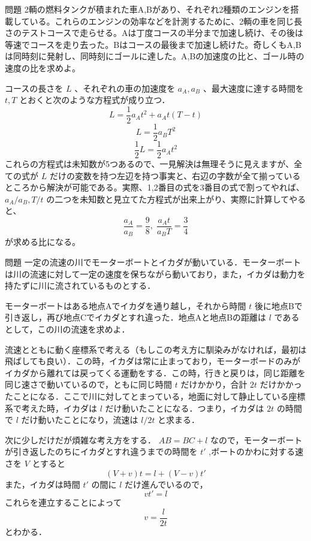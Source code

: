 \documentclass[
  b4paperpaper,
  xelatex,ja=standard]{bxjsbook}
\begin{document}
\begin{Qbox}{問題}
2輌の燃料タンクが積まれた車A,Bがあり、それぞれ2種類のエンジンを搭載している。これらのエンジンの効率などを計測するために、2輌の車を同じ長さのテストコースで走らせる。Aは丁度コースの半分まで加速し続け、その後は等速でコースを走り去った。Bはコースの最後まで加速し続けた。奇しくもA,Bは同時刻に発射し、同時刻にゴールに達した。A,Bの加速度の比と、ゴール時の速度の比を求めよ。

\end{Qbox}


コースの長さを \(L\) 、それぞれの車の加速度を \(a_A,a_B\)
、最大速度に達する時間を \(t,T\) とおくと次のような方程式が成り立つ．
\[L=\frac{1}{2}a_At^2+a_At(T-t)\] \[L=\frac{1}{2}a_BT^2\]
\[\frac{1}{2}L=\frac{1}{2}a_At^2\]
これらの方程式は未知数が5つあるので、一見解決は無理そうに見えますが、全ての式が
\(L\)
だけの変数を持つ左辺を持つ事実と、右辺の字数が全て揃っているところから解決が可能である。実際、1,2番目の式を3番目の式で割ってやれば、
\(a_A/a_B,T/t\)
の二つを未知数と見立てた方程式が出来上がり、実際に計算してやると、
\[\frac{a_A}{a_B}=\frac{9}{8},\;\frac{a_At}{a_BT}=\frac{3}{4}\]
が求める比になる。

\begin{Qbox}{問題}
一定の流速の川でモーターボートとイカダが動いている．モーターボートは川の流速に対して一定の速度を保ちながら動いており，また，イカダは動力を持たずに川に流されているものとする．

モーターボートはある地点Aでイカダを通り越し，それから時間 \(t\)
後に地点Bで引き返し，再び地点Cでイカダとすれ違った．地点Aと地点Bの距離は
\(l\) であるとして，この川の流速を求めよ．

\end{Qbox}


流速とともに動く座標系で考える（もしこの考え方に馴染みがなければ，最初は飛ばしても良い）．この時，イカダは常に止まっており，モーターボードのみがイカダから離れては戻ってくる運動をする．この時，行きと戻りは，同じ距離を同じ速さで動いているので，ともに同じ時間
\(t\) だけかかり，合計 \(2t\)
だけかかったことになる．ここで川に対してとまっている，地面に対して静止している座標系で考えた時，イカダは
\(l\) だけ動いたことになる．つまり，イカダは \(2t\) の時間で \(l\)
だけ動いたことになり，流速は \(l/2t\) と求まる．

次に少しだけだが煩雑な考え方をする． \(AB=BC+l\)
なので，モーターボートが引き返したのちにイカダとすれ違うまでの時間を
\(t'\) ,ボートのかわに対する速さを \(V\) とすると \[(V+v)t=l+(V-v)t'\]
また，イカダは時間 \(t'\) の間に \(l\) だけ進んでいるので， \[vt'=l\]
これらを連立することによって \[v=\frac{l}{2t}\] とわかる．
\end{document}
